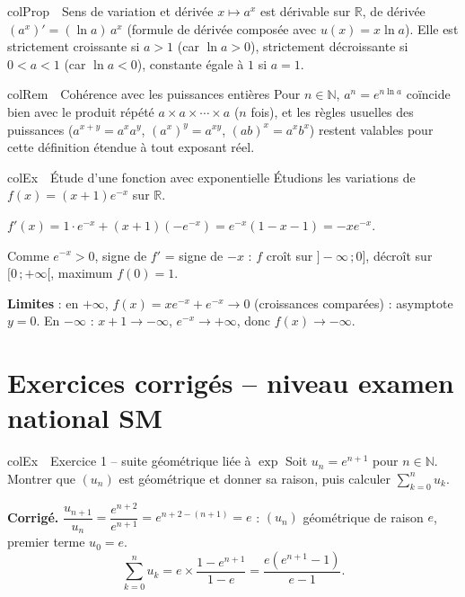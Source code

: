 \documentclass[11pt,a4paper]{article}
\newenvironment{propriete}[1][Propriété]
  {\begin{fiche}{colProp}{\ding{72}~~#1}}{\end{fiche}}
\newenvironment{exemple}[1][Exemple]
  {\begin{fiche}{colEx}{\ding{217}~~#1}}{\end{fiche}}
\newenvironment{remarque}[1][Remarque]
  {\begin{fiche}{colRem}{\ding{43}~~#1}}{\end{fiche}}
\begin{document}
\begin{propriete}[Sens de variation et dérivée]
$x\mapsto a^x$ est dérivable sur $\mathbb{R}$, de dérivée $\left(a^x\right)' = (\ln a)\,a^x$ (formule de dérivée composée avec $u(x)=x\ln a$). Elle est strictement croissante si $a>1$ (car $\ln a>0$), strictement décroissante si $0<a<1$ (car $\ln a<0$), constante égale à $1$ si $a=1$.
\end{propriete}

\begin{remarque}[Cohérence avec les puissances entières]
Pour $n\in\mathbb{N}$, $a^n=e^{n\ln a}$ coïncide bien avec le produit répété $a\times a\times\cdots\times a$ ($n$ fois), et les règles usuelles des puissances ($a^{x+y}=a^xa^y$, $(a^x)^y=a^{xy}$, $(ab)^x=a^xb^x$) restent valables pour cette définition étendue à tout exposant réel.
\end{remarque}

\begin{exemple}[Étude d'une fonction avec exponentielle]
Étudions les variations de $f(x)=(x+1)e^{-x}$ sur $\mathbb{R}$.

\smallskip
$f'(x) = 1\cdot e^{-x}+(x+1)(-e^{-x}) = e^{-x}(1-x-1) = -xe^{-x}$.

\smallskip
Comme $e^{-x}>0$, signe de $f'$ = signe de $-x$ : $f$ croît sur $]-\infty\,;0]$, décroît sur $[0\,;+\infty[$, maximum $f(0)=1$.

\smallskip
\textbf{Limites} : en $+\infty$, $f(x)=xe^{-x}+e^{-x}\to0$ (croissances comparées) : asymptote $y=0$. En $-\infty$ : $x+1\to-\infty$, $e^{-x}\to+\infty$, donc $f(x)\to-\infty$.
\end{exemple}

\section{Exercices corrigés -- niveau examen national SM}

\begin{exemple}[Exercice 1 -- suite géométrique liée à $\exp$]
Soit $u_n = e^{n+1}$ pour $n\in\mathbb{N}$. Montrer que $(u_n)$ est géométrique et donner sa raison, puis calculer $\displaystyle\sum_{k=0}^{n}u_k$.

\smallskip
\textbf{Corrigé.} $\dfrac{u_{n+1}}{u_n}=\dfrac{e^{n+2}}{e^{n+1}}=e^{n+2-(n+1)}=e$ : $(u_n)$ géométrique de raison $e$, premier terme $u_0=e$.
\[
  \sum_{k=0}^{n}u_k = e\times\frac{1-e^{n+1}}{1-e} = \frac{e\left(e^{n+1}-1\right)}{e-1}.
\]
\end{exemple}
\end{document}
